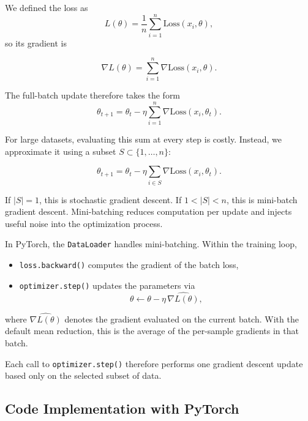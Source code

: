 We defined the loss as
\[
L(\theta) = \frac{1}{n}\sum_{i=1}^n \text{Loss}(x_i, \theta),
\]
so its gradient is

\[
\nabla L(\theta)
=
\sum_{i=1}^n \nabla \text{Loss}(x_i, \theta).
\]

The full-batch update therefore takes the form
\[
\theta_{t+1}
=
\theta_t
-
\eta
\sum_{i=1}^n
\nabla \text{Loss}(x_i, \theta_t).
\]

For large datasets, evaluating this sum at every step is costly.  
Instead, we approximate it using a subset $S \subset \{1,\dots,n\}$:

\[
\theta_{t+1}
=
\theta_t
-
\eta
\sum_{i \in S}
\nabla \text{Loss}(x_i, \theta_t).
\]

If $|S|=1$, this is stochastic gradient descent.  
If $1<|S|<n$, this is mini-batch gradient descent.  
Mini-batching reduces computation per update and injects useful noise into the optimization process.

\medskip

In PyTorch, the \texttt{DataLoader} handles mini-batching.  
Within the training loop,

\begin{itemize}
\item \texttt{loss.backward()} computes the gradient of the batch loss,
\item \texttt{optimizer.step()} updates the parameters via
\[
\theta \leftarrow \theta - \eta\,\widehat{\nabla L(\theta)},
\]
\end{itemize}

where $\widehat{\nabla L(\theta)}$ denotes the gradient evaluated on the current batch.  
With the default mean reduction, this is the average of the per-sample gradients in that batch.

Each call to \texttt{optimizer.step()} therefore performs one gradient descent update based only on the selected subset of data.

\bigskip

\subsection{Code Implementation with PyTorch}

\medskip

